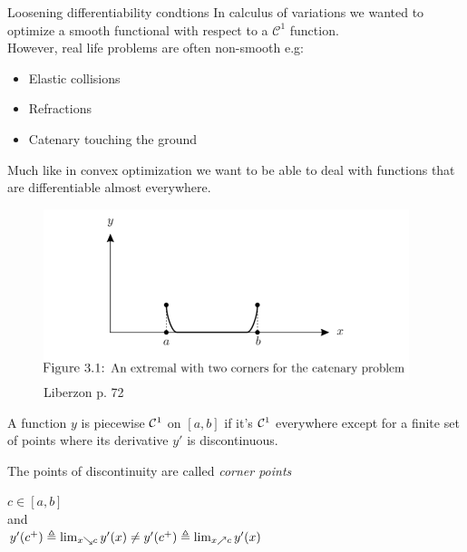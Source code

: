 \documentclass{beamer}
\begin{document}
\begin{frame}{Loosening differentiability condtions}
    In calculus of variations we wanted to optimize a smooth functional with
    respect to a \(\mathcal{C}^1\) function. \\

    However, real life problems are often non-smooth e.g:
    \begin{itemize}
        \item Elastic collisions
        \item Refractions
        \item Catenary touching the ground
    \end{itemize}
    Much like in convex optimization we want to be able to deal with functions that are differentiable almost everywhere.
\end{frame}
    \begin{frame}
        \begin{figure}[!htb]
            \centering
            \includegraphics[width=0.95\textwidth]{img/Catenary.png}
            \caption{Liberzon p. 72}
        \end{figure}
    \end{frame}
    \begin{frame}
        \begin{definition} 
            A function $y$ is piecewise \(\mathcal{C}^1\) on \(\left[a,b\right]\) if it's $\mathcal{C}^1$
            everywhere except for a finite set of points where its derivative $y'$ is discontinuous.
        \end{definition}
        The points of discontinuity are called \emph{corner points}
        \begin{definition}
            \(c \in \left[a,b\right]\) \\
            and \\
             \( y'(c^+) \triangleq \lim_{x \searrow c} y'(x) \neq  y'(c^+) \triangleq \lim_{x \nearrow c} y'(x)\)
        \end{definition}
    \end{frame}
\end{document}

